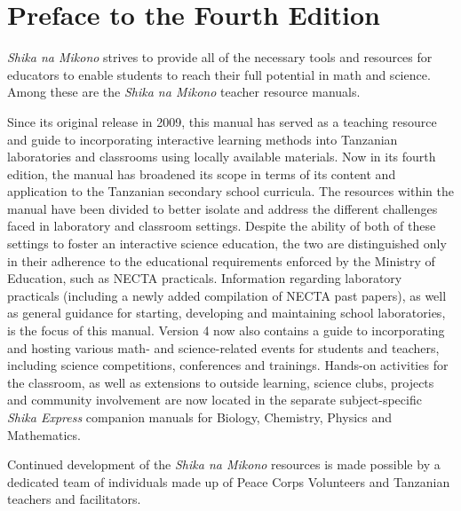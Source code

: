 \clearpage
{}
{}
\chapter*{Preface to the Fourth Edition}

\emph{Shika na Mikono} strives to provide all of the necessary tools and resources for educators to enable students to reach their full potential in math and science. Among these are the \emph{Shika na Mikono} teacher resource manuals.

Since its original release in 2009, this manual has served as a teaching resource and guide to incorporating interactive learning methods into Tanzanian laboratories and classrooms using locally available materials. Now in its fourth edition, the manual has broadened its scope in terms of its content and application to the Tanzanian secondary school curricula. The resources within the manual have been divided to better isolate and address the different challenges faced in laboratory and classroom settings. Despite the ability of both of these settings to foster an interactive science education, the two are distinguished only in their adherence to the educational requirements enforced by the Ministry of Education, such as NECTA practicals. Information regarding laboratory practicals (including a newly added compilation of NECTA past papers), as well as general guidance for starting, developing and maintaining school laboratories, is the focus of this manual. Version 4 now also contains a guide to incorporating and hosting various math- and science-related events for students and teachers, including science competitions, conferences and trainings. Hands-on activities for the classroom, as well as extensions to outside learning, science clubs, projects and community involvement are now located in the separate subject-specific \emph{Shika Express} companion manuals for Biology, Chemistry, Physics and Mathematics.

Continued development of the \emph{Shika na Mikono} resources is made possible by a dedicated team of individuals made up of Peace Corps Volunteers and Tanzanian teachers and facilitators.


